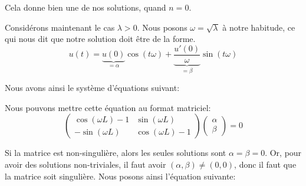 \documentclass[a4paper]{article}
\begin{document}
{{        Cela donne bien une de nos solutions, quand $n = 0$.

        Considérons maintenant le cas $\lambda > 0$. Nous posons $\omega = \sqrt{\lambda}$ à notre habitude, ce qui nous dit que notre solution doit être de la forme. 
        \[u\left(t\right) = \underbrace{u\left(0\right)}_{= \alpha}\cos\left(t \omega\right) + \underbrace{\frac{u'\left(0\right)}{\omega}}_{= \beta} \sin\left(t \omega\right)\]
        
        Nous avons ainsi le système d'équations suivant: 
        
        Nous pouvons mettre cette équation au format matriciel: 
        \[\begin{pmatrix} \cos\left(\omega L\right) - 1 & \sin\left(\omega L\right) \\ -\sin\left(\omega L\right) & \cos\left(\omega L\right) - 1 \end{pmatrix} \begin{pmatrix} \alpha \\ \beta \end{pmatrix} = 0\]

        Si la matrice est non-singulière, alors les seules solutions sont $\alpha = \beta = 0$. Or, pour avoir des solutions non-triviales, il faut avoir $\left(\alpha, \beta\right) \neq \left(0, 0\right)$, donc il faut que la matrice soit singulière. Nous posons ainsi l'équation suivante: 
        
}}
\end{document}
